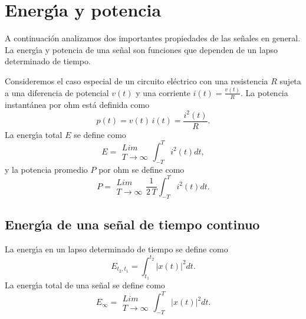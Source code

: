 

\section{Energ\'{\i}a y potencia}

A continuaci\'{o}n analizamos dos importantes propiedades de las
se\~{n}ales en general. La energ\'{\i}a y potencia de una se\~{n}al
son funciones que dependen de un lapso determinado de tiempo.

Consideremos el caso especial de un circuito el\'{e}ctrico con una
resistencia $R$ sujeta a una diferencia de potencial $v(t)$ y una
corriente $i(t) = \frac{v(t)}{R}$. La potencia instant\'{a}nea por ohm
est\'{a} definida como
\begin{equation}
  p(t) = v(t) \, i(t) = \frac{i^{2}(t)}{R}.
\end{equation}
La energ\'{\i}a total $E$ se define como
\begin{equation}
  E = 
  \begin{array}{l}
    Lim \\ 
    T\rightarrow \infty
  \end{array}
\int_{-T}^{T} i^{2}(t) dt,
\end{equation}
y la potencia promedio $P$ por ohm se define como
\begin{equation}
  P =         
  \begin{array}{l}
    Lim \\ 
    T\rightarrow \infty
  \end{array}
  \frac{1}{2 \, T} \int_{-T}^{T} i^{2}(t) dt.
\end{equation}

\subsection{Energ\'{\i}a de una se\~{n}al de tiempo continuo}

La energ\'{\i}a en un lapso determinado de tiempo se define como
\begin{equation}
  E_{t_{2},t_{1}}=\int_{t_{1}}^{t_{2}}\left| x\left( t\right) \right| ^{2}dt.
\end{equation}
La energ\'{\i}a total de una se\~{n}al se define como
\begin{equation}
  E_{\infty }= 
  \begin{array}{l}
    Lim \\ 
    T\rightarrow \infty
  \end{array}
  \int_{-T}^{T}\left| x\left( t\right) \right| ^{2}dt.
\end{equation}

